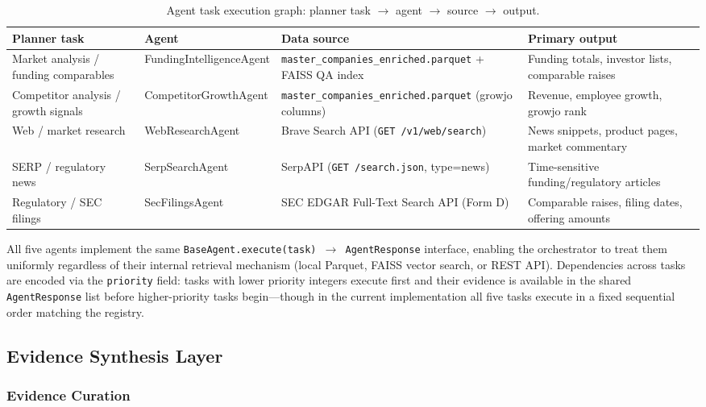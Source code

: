 \documentclass[preprint,12pt]{elsarticle}
\begin{document}
\begin{table}[!t]
\small\centering
\caption{Agent task execution graph: planner task $\rightarrow$ agent $\rightarrow$ source $\rightarrow$ output.}
\label{tab:exec_graph}
\begin{tabular}{p{3.6cm} p{3.4cm} p{4.0cm} p{4.0cm}}
\toprule
\textbf{Planner task} & \textbf{Agent} & \textbf{Data source} & \textbf{Primary output} \\
\midrule
Market analysis / funding comparables
  & FundingIntelligenceAgent
  & \texttt{master\_companies\_enriched.parquet} + FAISS QA index
  & Funding totals, investor lists, comparable raises \\
Competitor analysis / growth signals
  & CompetitorGrowthAgent
  & \texttt{master\_companies\_enriched.parquet} (growjo columns)
  & Revenue, employee growth, growjo rank \\
Web / market research
  & WebResearchAgent
  & Brave Search API (\texttt{GET /v1/web/search})
  & News snippets, product pages, market commentary \\
SERP / regulatory news
  & SerpSearchAgent
  & SerpAPI (\texttt{GET /search.json}, type=news)
  & Time-sensitive funding/regulatory articles \\
Regulatory / SEC filings
  & SecFilingsAgent
  & SEC EDGAR Full-Text Search API (Form D)
  & Comparable raises, filing dates, offering amounts \\
\bottomrule
\end{tabular}
\end{table}

All five agents implement the same \texttt{BaseAgent.execute(task) $\rightarrow$ AgentResponse}
interface, enabling the orchestrator to treat them uniformly regardless of
their internal retrieval mechanism (local Parquet, FAISS vector search, or
REST API). Dependencies across tasks are encoded via the \texttt{priority}
field: tasks with lower priority integers execute first and their evidence is
available in the shared \texttt{AgentResponse} list before higher-priority
tasks begin---though in the current implementation all five tasks execute in
a fixed sequential order matching the registry.

\subsection{Evidence Synthesis Layer}

\subsubsection{Evidence Curation}
\end{document}
